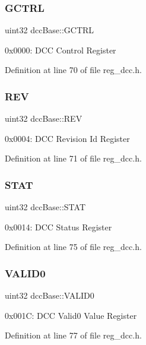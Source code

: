 \subsubsection{\texorpdfstring{G\+C\+T\+RL}{GCTRL}}
{\footnotesize\ttfamily uint32 dcc\+Base\+::\+G\+C\+T\+RL}

0x0000\+: D\+CC Control Register 

Definition at line 70 of file reg\+\_\+dcc.\+h.

\mbox{\label{structdccBase_ad70d7ae72f9e49bcb75bfef62da53adb}} 
\subsubsection{\texorpdfstring{R\+EV}{REV}}
{\footnotesize\ttfamily uint32 dcc\+Base\+::\+R\+EV}

0x0004\+: D\+CC Revision Id Register 

Definition at line 71 of file reg\+\_\+dcc.\+h.

\mbox{\label{structdccBase_a77b628cd6a60ca3b69c3cc646dbb2c41}} 
\subsubsection{\texorpdfstring{S\+T\+AT}{STAT}}
{\footnotesize\ttfamily uint32 dcc\+Base\+::\+S\+T\+AT}

0x0014\+: D\+CC Status Register 

Definition at line 75 of file reg\+\_\+dcc.\+h.

\mbox{\label{structdccBase_aaa721e00ac4925fcf86eac56f6619412}} 
\subsubsection{\texorpdfstring{V\+A\+L\+I\+D0}{VALID0}}
{\footnotesize\ttfamily uint32 dcc\+Base\+::\+V\+A\+L\+I\+D0}

0x001C\+: D\+CC Valid0 Value Register 

Definition at line 77 of file reg\+\_\+dcc.\+h.

\mbox{\label{structdccBase_addfa988fe6058c57f10b3b14f8a8f3cc}} 

